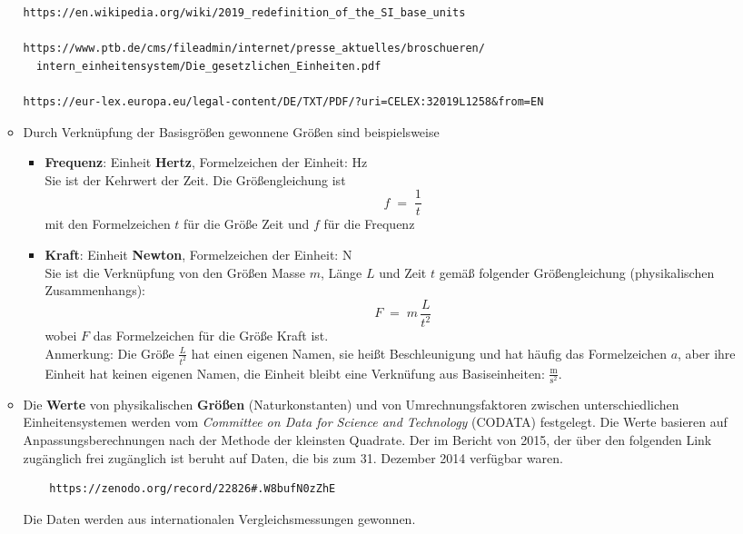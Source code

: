 \begin{raggedright}
\begin{enumerate}
\begin{itemize}
\begin{verbatim}
https://en.wikipedia.org/wiki/2019_redefinition_of_the_SI_base_units

https://www.ptb.de/cms/fileadmin/internet/presse_aktuelles/broschueren/
  intern_einheitensystem/Die_gesetzlichen_Einheiten.pdf

https://eur-lex.europa.eu/legal-content/DE/TXT/PDF/?uri=CELEX:32019L1258&from=EN
	\end{verbatim}
	\item Durch Verknüpfung der Basisgrößen gewonnene Größen sind beispielsweise
		\begin{itemize}
		\item \textbf{Frequenz}: Einheit \textbf{Hertz}, Formelzeichen der Einheit: Hz\\
			Sie ist der Kehrwert der Zeit. Die Größengleichung ist
\begin{equation}
			f \; = \; \frac{1}{t}
\end{equation}
			mit den Formelzeichen $t$ für die Größe Zeit und $f$ für die Frequenz
		\item \textbf{Kraft}: Einheit \textbf{Newton}, Formelzeichen der Einheit: N\\
			Sie ist die Verknüpfung von den Größen Masse $m$, Länge $L$ und Zeit $t$
			gemäß folgender Größengleichung (physikalischen Zusammenhangs):
\begin{equation}
			F \; = \; m \, \frac{L}{t^2}
\end{equation}
			wobei $F$ das Formelzeichen für die Größe Kraft ist.\\
			Anmerkung: Die Größe $\frac{L}{t^2}$ hat einen eigenen Namen, sie heißt
			Beschleunigung und hat häufig das Formelzeichen $a$, aber ihre Einheit hat keinen
			eigenen Namen, die Einheit bleibt eine Verknüfung aus Basiseinheiten:
			$\frac{\mathrm{m}}{\mathrm{s}^2}$.
		\end{itemize}
		\item Die \textbf{Werte} von physikalischen \textbf{Größen} (Naturkonstanten)
			und von Umrechnungsfaktoren zwischen unterschiedlichen
			Einheitensystemen werden vom \textsl{Committee on Data for Science and Technology} (CODATA)
			festgelegt. Die Werte basieren auf Anpassungsberechnungen nach der Methode der kleinsten
			Quadrate. Der im Bericht von 2015, der über den folgenden Link zugänglich frei zugänglich ist
			beruht auf Daten, die bis zum 31. Dezember 2014 verfügbar waren.
	\begin{verbatim}
	https://zenodo.org/record/22826#.W8bufN0zZhE
	\end{verbatim}
			Die Daten werden aus internationalen Vergleichsmessungen gewonnen.

\end{itemize}
\end{enumerate}
\end{raggedright}
